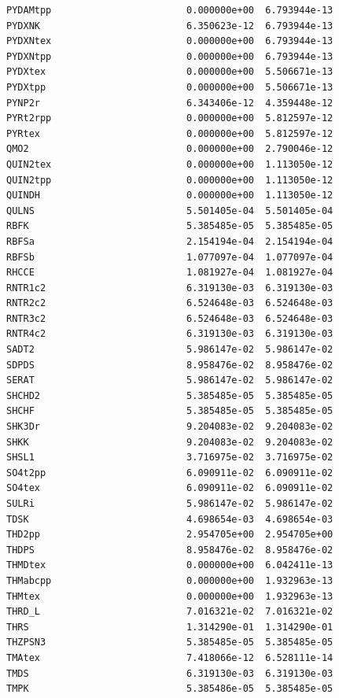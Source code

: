 \documentclass{scrartcl}
\begin{document}
\begin{enumerate}
\begin{lstlisting}
PYDAMtpp                        0.000000e+00  6.793944e-13
PYDXNK                          6.350623e-12  6.793944e-13
PYDXNtex                        0.000000e+00  6.793944e-13
PYDXNtpp                        0.000000e+00  6.793944e-13
PYDXtex                         0.000000e+00  5.506671e-13
PYDXtpp                         0.000000e+00  5.506671e-13
PYNP2r                          6.343406e-12  4.359448e-12
PYRt2rpp                        0.000000e+00  5.812597e-12
PYRtex                          0.000000e+00  5.812597e-12
QMO2                            0.000000e+00  2.790046e-12
QUIN2tex                        0.000000e+00  1.113050e-12
QUIN2tpp                        0.000000e+00  1.113050e-12
QUINDH                          0.000000e+00  1.113050e-12
QULNS                           5.501405e-04  5.501405e-04
RBFK                            5.385485e-05  5.385485e-05
RBFSa                           2.154194e-04  2.154194e-04
RBFSb                           1.077097e-04  1.077097e-04
RHCCE                           1.081927e-04  1.081927e-04
RNTR1c2                         6.319130e-03  6.319130e-03
RNTR2c2                         6.524648e-03  6.524648e-03
RNTR3c2                         6.524648e-03  6.524648e-03
RNTR4c2                         6.319130e-03  6.319130e-03
SADT2                           5.986147e-02  5.986147e-02
SDPDS                           8.958476e-02  8.958476e-02
SERAT                           5.986147e-02  5.986147e-02
SHCHD2                          5.385485e-05  5.385485e-05
SHCHF                           5.385485e-05  5.385485e-05
SHK3Dr                          9.204083e-02  9.204083e-02
SHKK                            9.204083e-02  9.204083e-02
SHSL1                           3.716975e-02  3.716975e-02
SO4t2pp                         6.090911e-02  6.090911e-02
SO4tex                          6.090911e-02  6.090911e-02
SULRi                           5.986147e-02  5.986147e-02
TDSK                            4.698654e-03  4.698654e-03
THD2pp                          2.954705e+00  2.954705e+00
THDPS                           8.958476e-02  8.958476e-02
THMDtex                         0.000000e+00  6.042411e-13
THMabcpp                        0.000000e+00  1.932963e-13
THMtex                          0.000000e+00  1.932963e-13
THRD_L                          7.016321e-02  7.016321e-02
THRS                            1.314290e-01  1.314290e-01
THZPSN3                         5.385485e-05  5.385485e-05
TMAtex                          7.418066e-12  6.528111e-14
TMDS                            6.319130e-03  6.319130e-03
TMPK                            5.385486e-05  5.385485e-05

\end{lstlisting}
\end{enumerate}
\end{document}

